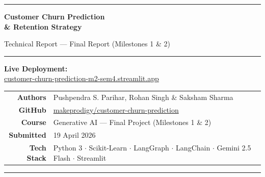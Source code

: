 \documentclass[12pt,a4paper]{article}
\begin{document}

\begin{titlepage}
    \centering
    \vspace*{1cm}
    {\color{primary}\rule{\linewidth}{2pt}}
    \vspace{0.5cm}

    {\LARGE\bfseries\color{primary} Customer Churn Prediction \\ \& Retention Strategy}

    \vspace{0.3cm}
    {\large\color{gray} Technical Report --- Final Report (Milestones 1 \& 2)}

    \vspace{0.3cm}
    {\color{primary}\rule{\linewidth}{0.5pt}}

    \vspace{1.5cm}
    \begin{tcolorbox}[colback=lightgray, colframe=primary!40, width=0.85\linewidth]
        \centering
        \textbf{Live Deployment:}\\[4pt]
        \href{https://customer-churn-prediction-m2-sem4.streamlit.app/}
             {\ttfamily\small customer-churn-prediction-m2-sem4.streamlit.app}
    \end{tcolorbox}

    \vspace{1cm}
    \begin{tabular}{rl}
        \textbf{Authors}     & Pushpendra S. Parihar, Rohan Singh \& Saksham Sharma \\[4pt]
        \textbf{GitHub}      & \href{https://github.com/makeprodigy/customer-churn-prediction}{makeprodigy/customer-churn-prediction} \\[4pt]
        \textbf{Course}      & Generative AI --- Final Project (Milestones 1 \& 2) \\[4pt]
        \textbf{Submitted}   & 19 April 2026 \\[4pt]
        \textbf{Tech Stack}  & Python 3 $\cdot$ Scikit-Learn $\cdot$ LangGraph $\cdot$ LangChain $\cdot$ Gemini 2.5 Flash $\cdot$ Streamlit \\
    \end{tabular}

    \vfill
    {\color{primary}\rule{\linewidth}{2pt}}
\end{titlepage}
\end{document}
